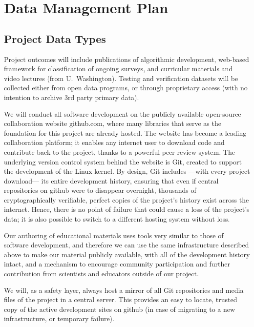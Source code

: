 \documentclass[11pt]{article}
\begin{document}
\section*{\label{sec:Data-Management-Plan}Data Management Plan}

\setcounter{page}{1}


\subsection*{Project Data Types}

Project outcomes will include publications of algorithmic development, web-based framework for
classification of ongoing surveys, and curricular materials and video lectures (from U.~Washington).
Testing and verification datasets will be collected either from open data programs, or through proprietary access
(with no intention to archive 3rd party primary data).

We will conduct all software development on the publicly available
open-source collaboration website github.com, where many libraries
that serve as the foundation for this project are already hosted.
The website has become a leading collaboration platform;
it enables any internet user to download code and contribute back to the
project, thanks to a powerful peer-review system.
The underlying version control system behind the website is
Git, created to support the development of the Linux kernel. By design,
Git includes ---with every project download--- its entire development
history, ensuring that even if central repositories on github
were to disappear overnight, thousands of cryptographically verifiable,
perfect copies of the project's history exist across the internet.
Hence, there is no point of failure that could cause a loss of
the project's data; it is also possible to switch to a different hosting
system without loss.

Our authoring of educational materials uses tools very similar to
those of software development, and therefore we can use the same infrastructure
described above to make our material publicly available, with all of the
development history intact, and a mechanism to encourage community
participation and further contribution from scientists and educators
outside of our project.


We will, as a safety layer, always host a mirror of all Git repositories
and media files of the project in a central server. This provides an easy to locate, trusted copy of the
active development sites on github (in case of migrating to a new infrastructure, or temporary failure).
\end{document}
